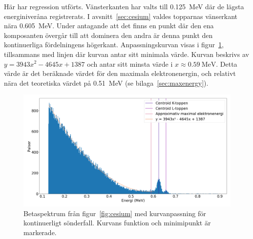 Här har regression utförts. Vänsterkanten har valts till \qty{0.125}{\MeV} där
de lägsta energiniveråna registrerats. I avsnitt~\ref{sec:cesium} valdes
topparnas vänserkant nära \qty{0.605}{\MeV}. Under antagande att det finns en
punkt där den ena komposanten övergår till att dominera den andra är denna
punkt den kontinuerliga fördelningens högerkant. Anpassningskurvan visas i
figur~\ref{fig:cesiumcurve}, tillsammans med linjen där kurvan antar sitt
minimala värde. Kurvan beskrivs av
$y = \num{3943}x^2 - \num{4645}x + \num{1387}$ och antar sitt minsta värde i
$x \approx \qty{0.59}{\MeV}$. Detta värde är det beräknade värdet för den
maximala elektronenergin, och relativt nära det teoretiska värdet på
\qty{0.51}{\MeV} (se bilaga~\ref{sec:maxenergy}).

\begin{figure}[!hp]
    \centering
    \includegraphics[width=\textwidth, keepaspectratio]{../images/cesium_curve.png}
    \caption{
        Betaspektrum från figur~\ref{fig:cesium} med kurvanpassning för
        kontinuerligt sönderfall. Kurvans funktion och minimipunkt är
        markerade.
    }
    \label{fig:cesiumcurve}
\end{figure}
